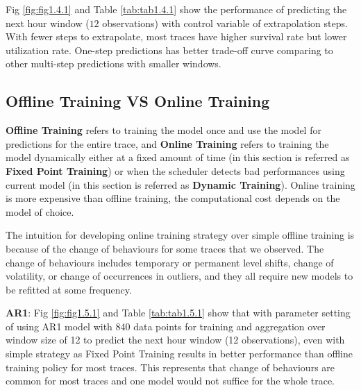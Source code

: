 \documentclass{article}
\begin{document}
\begin{flushleft}
Fig \ref{fig:fig1.4.1} and Table \ref{tab:tab1.4.1} show the performance of predicting the next hour window ($12$ observations) with control variable of extrapolation steps. With fewer steps to extrapolate, most traces have higher survival rate but lower utilization rate. One-step predictions has better trade-off curve comparing to other multi-step predictions with smaller windows.
\end{flushleft}

\subsection{Offline Training VS Online Training}

\begin{flushleft}
\textbf{Offline Training} refers to training the model once and use the model for predictions for the entire trace, and \textbf{Online Training} refers to training the model dynamically either at a fixed amount of time (in this section is referred as \textbf{Fixed Point Training}) or when the scheduler detects bad performances using current model (in this section is referred as \textbf{Dynamic Training}). Online training is more expensive than offline training, the computational cost depends on the model of choice.
\end{flushleft}

\begin{flushleft}
The intuition for developing online training strategy over simple offline training is because of the change of behaviours for some traces that we observed. The change of behaviours includes temporary or permanent level shifts, change of volatility, or change of occurrences in outliers, and they all require new models to be refitted at some frequency.
\end{flushleft}

\begin{flushleft}
\textbf{AR1}: Fig \ref{fig:fig1.5.1} and Table \ref{tab:tab1.5.1} show that with parameter setting of using AR1 model with 840 data points for training and aggregation over window size of 12 to predict the next hour window (12 observations), even with simple strategy as Fixed Point Training results in better performance than offline training policy for most traces. This represents that change of behaviours are common for most traces and one model would not suffice for the whole trace.
\end{flushleft}
\end{document}
